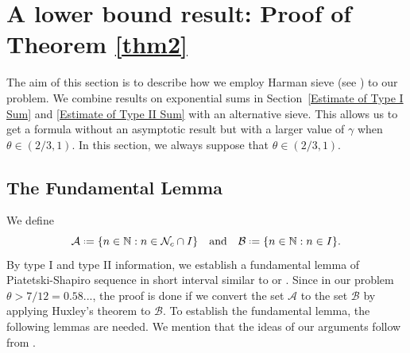 \documentclass[12pt, reqno, twoside, letterpaper]{amsart}
\numberwithin{equation}{section}
\newcommand{\cA}{\ensuremath{\mathcal{A}}}
\newcommand{\cB}{\ensuremath{\mathcal{B}}}
\newcommand{\cN}{\ensuremath{\mathcal{N}}}
\newcommand{\NN}{\ensuremath{\mathbb{N}}}
\theoremstyle{customthm}
\theoremstyle{customrem}
\newcommand*{\defeq}{\mathrel{\vcenter{\baselineskip0.5ex \lineskiplimit0pt
			\hbox{\scriptsize.}\hbox{\scriptsize.}}}%
	=}
\begin{document}
\section{A lower bound result: Proof of Theorem \ref{thm2}} \label{sec:lower bound}
The aim of this section is to describe how we employ Harman sieve (see \cite{BaHaRi}) to our problem. We combine results on exponential sums in Section~\ref{Estimate of Type I Sum} and \ref{Estimate of Type II Sum} with an alternative sieve. This allows us to get a formula without an asymptotic result but with a larger value of $\gamma$ when $\theta \in (2/3,1)$. In this section, we always suppose that $\theta \in (2/3,1)$. 


\subsection{The Fundamental Lemma}
We define
$$
\cA \defeq \{n\in \NN: n \in \cN_c \cap I\} \quad \text{and} \quad \cB \defeq \{ n \in \NN: n \in I \}.
$$
By type I and type II information, we establish a fundamental lemma of Piatetski-Shapiro sequence in short interval similar to \cite[Theorem~3.1]{Ha} or \cite[Lemma~5.4]{SDP}. Since in our problem $\theta>7/12=0.58...$, the proof is done if we convert the set $\cA$ to the set $\cB$ by applying Huxley's theorem to $\cB$. To establish the fundamental lemma, the following lemmas are needed. We mention that the ideas of our arguments follow from \cite[Lemma~7-10]{Kum}.
\end{document}
